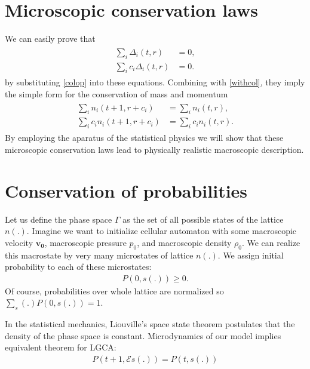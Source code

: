 \section{Microscopic conservation laws}
We can easily prove that
\begin{align*}
\begin{split}
\sum_i \Delta_i(t,r) &= 0,\\
\sum_i c_i \Delta_i(t,r) &= 0.
\end{split}
\end{align*}
by substituting \ref{colop} into these equations. Combining with \ref{withcol}, they imply the simple form for the conservation of mass and momentum
\begin{align} \label{cons1}
\begin{split}
\sum_i n_i(t+1, r + c_i) &= \sum_i n_i(t,r), \\
\sum_i c_i n_i(t+1, r + c_i) &= \sum_i c_i n_i(t,r).
\end{split}
\end{align}
By employing the aparatus of the statistical physics we will show that these microscopic conservation laws lead to physically realistic macroscopic description.

\section{Conservation of probabilities}
Let us define the phase space $\Gamma$ as the set of all possible states of the lattice $n(.)$.
Imagine we want to initialize cellular automaton with some macroscopic velocity $\bm{v_0}$, macroscopic pressure $p_0$, and macroscopic density $\rho_0$.
We can realize this macrostate by very many microstates of lattice $n(.)$.
We assign initial probability to each of these microstates:
\begin{align*}
P(0,s(.)) \geq 0.
\end{align*}
Of course, probabilities over whole lattice are normalized so
$\sum_s(.) P(0,s(.)) = 1$.

In the statistical mechanics, Liouville's space state theorem postulates that the density of the phase space is constant. Microdynamics of our model implies equivalent theorem for LGCA:
\begin{align*}
P(t+1, \mathcal{E} s(.)) = P(t, s(.))
\end{align*}

